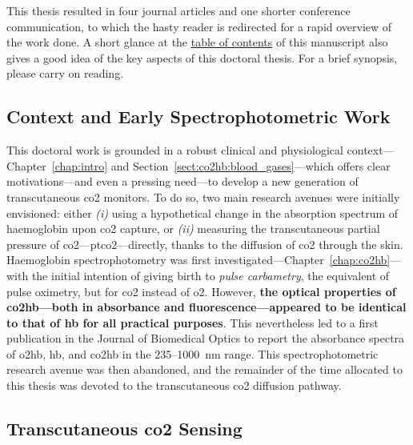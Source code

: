 This thesis resulted in four journal articles and one shorter conference communication\cite{dervieux2020, dervieux2022, dervieux2023rate, dervieux2024phase, dervieux2024newcas}, to which the hasty reader is redirected for a rapid overview of the work done. A short glance at the \hyperref[chapter:toc]{table of contents} of this manuscript also gives a good idea of the key aspects of this doctoral thesis. For a brief synopsis, please carry on reading.

\subsection{Context and Early Spectrophotometric Work}

This doctoral work is grounded in a robust clinical and physiological context---Chapter~\ref{chap:intro} and Section~\ref{sect:co2hb:blood_gases}---which offers clear motivations---and even a pressing need---to develop a new generation of transcutaneous \gls{co2} monitors. To do so, two main research avenues were initially envisioned: either \textit{(i)} using a hypothetical change in the absorption spectrum of haemoglobin upon \gls{co2} capture, or \textit{(ii)} measuring the transcutaneous partial pressure of \gls{co2}---\gls{ptco2}---directly, thanks to the diffusion of \gls{co2} through the skin. Haemoglobin spectrophotometry was first investigated---Chapter~\ref{chap:co2hb}---with the initial intention of giving birth to \emph{pulse carbametry}, \ie{} the equivalent of pulse oximetry, but for \gls{co2} instead of \gls{o2}. However, \textbf{the optical properties of \gls{co2hb}---both in absorbance and fluorescence---appeared to be identical to that of \gls{hb} for all practical purposes}. This nevertheless led to a first publication in the Journal of Biomedical Optics to report the absorbance spectra of \gls{o2hb}, \gls{hb}, and \gls{co2hb} in the 235--1000~nm range\cite{dervieux2020}. This spectrophotometric research avenue was then abandoned, and the remainder of the time allocated to this thesis was devoted to the transcutaneous \gls{co2} diffusion pathway.

\subsection{Transcutaneous \texorpdfstring{\gls{co2}}{CO2} Sensing}

